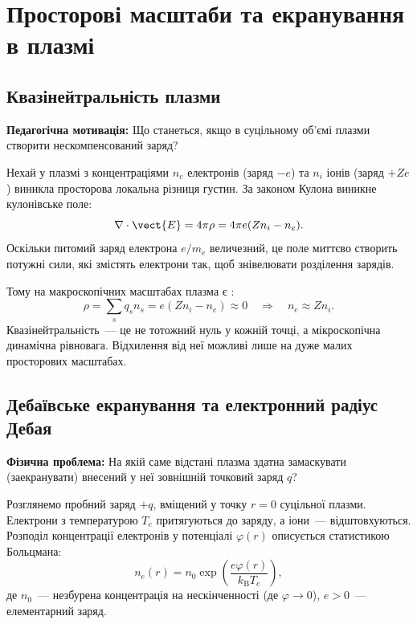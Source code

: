 \section{Просторові масштаби та екранування в плазмі}\label{sec:spatial-scales}

\subsection{Квазінейтральність плазми}

\textbf{Педагогічна мотивація:} Що станеться, якщо в суцільному об'ємі плазми створити нескомпенсований заряд?

Нехай у плазмі з концентраціями $n_e$ електронів (заряд $-e$) та $n_i$ іонів (заряд $+Ze$) виникла просторова локальна різниця густин. За законом Кулона виникне кулонівське поле:
\begin{equation}
	\nabla \cdot \vect{E} = 4\pi \rho = 4\pi e (Z n_i - n_e).
\end{equation}
Оскільки питомий заряд електрона $e/m_e$ величезний, це поле миттєво створить потужні сили, які змістять електрони так, щоб знівелювати розділення зарядів.

Тому на макроскопічних масштабах плазма є :
\begin{equation}\label{eq:quasineutrality}
	\rho = \sum_s q_s n_s = e(Z n_i - n_e) \approx 0 \quad \Rightarrow \quad n_e \approx Z n_i.
\end{equation}
Квазінейтральність~--- це не тотожний нуль у кожній точці, а мікроскопічна динамічна рівновага. Відхилення від неї можливі лише на дуже малих просторових масштабах.

\subsection{Дебаївське екранування та електронний радіус Дебая}

\textbf{Фізична проблема:} На якій саме відстані плазма здатна замаскувати (заекранувати) внесений у неї зовнішній точковий заряд $q$?

Розглянемо пробний заряд $+q$, вміщений у точку $r = 0$ суцільної плазми. Електрони з температурою $T_e$ притягуються до заряду, а іони~--- відштовхуються. Розподіл концентрації електронів у потенціалі $\varphi(r)$ описується статистикою Больцмана:
\begin{equation}
	n_e(r) = n_0 \exp\left(\frac{e\varphi(r)}{k_{\mathrm B}T_e}\right),
\end{equation}
де $n_0$~--- незбурена концентрація на нескінченності (де $\varphi \to 0$), $e > 0$~--- елементарний заряд.

